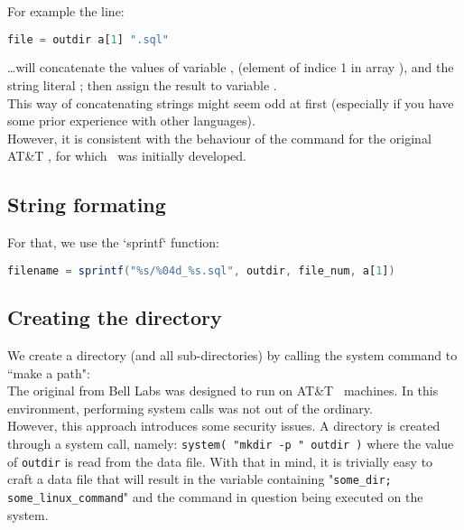 For example the line:
\begin{lstlisting}[language=awk]
file = outdir a[1] ".sql"
\end{lstlisting}

\dots will concatenate the values of variable ,  (element of indice 1 in array ), and the string literal ; then assign the result to variable . \\

This way of concatenating strings might seem odd at first (especially if you have some prior experience with other languages). \\

However, it is consistent with the behaviour of the  command for the original AT\&T \Unix, for which \awk\ was initially developed.


\subsection*{String formating}

For that, we use the `sprintf` function:
\begin{lstlisting}[language=awk]
filename = sprintf("%s/%04d_%s.sql", outdir, file_num, a[1])
\end{lstlisting}




\subsection*{Creating the directory}

We create a directory (and all sub-directories) by calling the system command to ``make a path":  \\

The original  from Bell Labs was designed to run on AT\&T \Unix\ machines. In this environment, performing system calls was not out of the ordinary. \\

However, this approach introduces some security issues. A directory is created through a system call, namely: \texttt{system( "mkdir -p " outdir )} where the value of \texttt{outdir} is read from the data file. With that in mind, it is trivially easy to craft a data file that will result in the  variable containing "\texttt{some\_dir; some\_linux\_command}" and the command in question being executed on the system. \\

